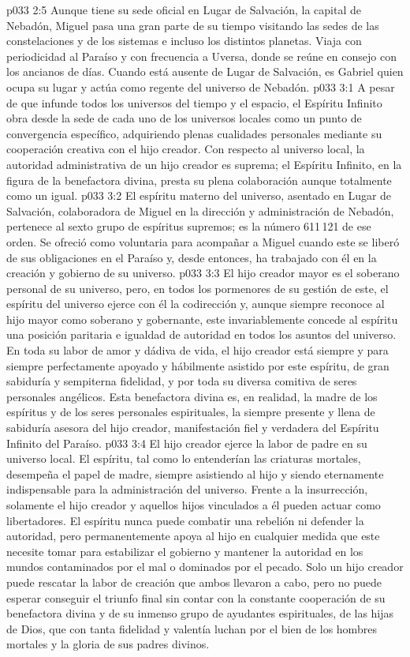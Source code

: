 \vs p033 2:5 \pc Aunque tiene su sede oficial en Lugar de Salvación, la capital de Nebadón, Miguel pasa una gran parte de su tiempo visitando las sedes de las constelaciones y de los sistemas e incluso los distintos planetas. Viaja con periodicidad al Paraíso y con frecuencia a Uversa, donde se reúne en consejo con los ancianos de días. Cuando está ausente de Lugar de Salvación, es Gabriel quien ocupa su lugar y actúa como regente del universo de Nebadón.
\vs p033 3:1 A pesar de que infunde todos los universos del tiempo y el espacio, el Espíritu Infinito obra desde la sede de cada uno de los universos locales como un punto de convergencia específico, adquiriendo plenas cualidades personales mediante su cooperación creativa con el hijo creador. Con respecto al universo local, la autoridad administrativa de un hijo creador es suprema; el Espíritu Infinito, en la figura de la benefactora divina, presta su plena colaboración aunque totalmente como un igual.
\vs p033 3:2 \pc El espíritu materno del universo, asentado en Lugar de Salvación, colaboradora de Miguel en la dirección y administración de Nebadón, pertenece al sexto grupo de espíritus supremos; es la número 611\,121 de ese orden. Se ofreció como voluntaria para acompañar a Miguel cuando este se liberó de sus obligaciones en el Paraíso y, desde entonces, ha trabajado con él en la creación y gobierno de su universo.
\vs p033 3:3 \pc El hijo creador mayor es el soberano personal de su universo, pero, en todos los pormenores de su gestión de este, el espíritu del universo ejerce con él la codirección y, aunque siempre reconoce al hijo mayor como soberano y gobernante, este invariablemente concede al espíritu una posición paritaria e igualdad de autoridad en todos los asuntos del universo. En toda su labor de amor y dádiva de vida, el hijo creador está siempre y para siempre perfectamente apoyado y hábilmente asistido por este espíritu, de gran sabiduría y sempiterna fidelidad, y por toda su diversa comitiva de seres personales angélicos. Esta benefactora divina es, en realidad, la madre de los espíritus y de los seres personales espirituales, la siempre presente y llena de sabiduría asesora del hijo creador, manifestación fiel y verdadera del Espíritu Infinito del Paraíso.
\vs p033 3:4 \pc El hijo creador ejerce la labor de padre en su universo local. El espíritu, tal como lo entenderían las criaturas mortales, desempeña el papel de madre, siempre asistiendo al hijo y siendo eternamente indispensable para la administración del universo. Frente a la insurrección, solamente el hijo creador y aquellos hijos vinculados a él pueden actuar como libertadores. El espíritu nunca puede combatir una rebelión ni defender la autoridad, pero permanentemente apoya al hijo en cualquier medida que este necesite tomar para estabilizar el gobierno y mantener la autoridad en los mundos contaminados por el mal o dominados por el pecado. Solo un hijo creador puede rescatar la labor de creación que ambos llevaron a cabo, pero no puede esperar conseguir el triunfo final sin contar con la constante cooperación de su benefactora divina y de su inmenso grupo de ayudantes espirituales, de las hijas de Dios, que con tanta fidelidad y valentía luchan por el bien de los hombres mortales y la gloria de sus padres divinos.
